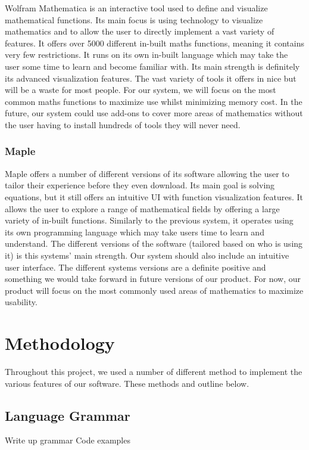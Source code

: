 \documentclass[a4paper, oneside, 11pt]{report}
\begin{document}
Wolfram Mathematica is an interactive tool used to define and visualize mathematical functions. Its main focus is using technology to visualize mathematics and to allow the user to directly implement a vast variety of features. It offers over 5000 different in-built maths functions, meaning it contains very few restrictions. It runs on its own in-built language which may take the user some time to learn and become familiar with. Its main strength is definitely its advanced visualization features.
The vast variety of tools it offers in nice but will be a waste for most people. For our system, we will focus on the most common maths functions to maximize use whilst minimizing memory cost. In the future, our system could use add-ons to cover more areas of mathematics without the user having to install hundreds of tools they will never need.


\subsection{Maple\cite{Maple}}

Maple offers a number of different versions of its software allowing the user to tailor their experience before they even download. Its main goal is solving equations, but it still offers an intuitive UI with function visualization features. It allows the user to explore a range of mathematical fields by offering a large variety of in-built functions. Similarly to the previous system, it operates using its own programming language which may take users time to learn and understand. The different versions of the software (tailored based on who is using it) is this systems' main strength.
Our system should also include an intuitive user interface. The different systems versions are a definite positive and something we would take forward in future versions of our product. For now, our product will focus on the most commonly used areas of mathematics to maximize usability.


\chapter{Methodology}

Throughout this project, we used a number of different method to implement the various features of our software. These methods and outline below.

\section{Language Grammar}
Write up grammar
Code examples
\end{document}
